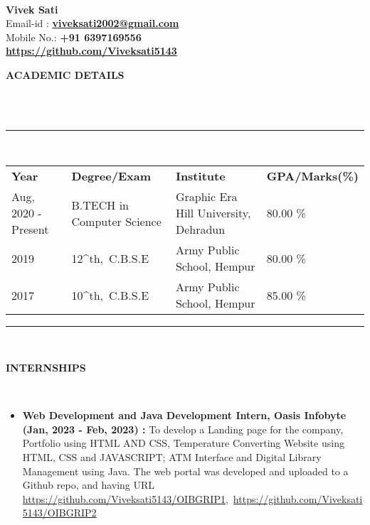 \documentclass[a4paper,10pt]{article}
\newcommand{\lsep}{-0.5cm}
\newcommand{\resheading}[1]{{\small \colorbox{mygrey}{\begin{minipage}{0.975\textwidth}{\textbf{#1 \vphantom{p\^{E}}}}\end{minipage}}}}
\begin{document}
\hspace{0.5cm}\\[-0.2cm]

\textbf{Vivek Sati} \\
\indent Email-id : \textbf{\url{viveksati2002@gmail.com}} \\
\indent Mobile No.: \textbf{+91 6397169556} \ \\
\indent \textbf{\url{https://github.com/Viveksati5143}}\\

\resheading{\textbf{ACADEMIC DETAILS} }\\[\lsep]
\\
\indent \rule{6.8in}{0.4pt}\\
\indent \begin{tabular}{ l @{\hskip 0.15in} l @{\hskip 0.15in} l @{\hskip 0.15in} l @{\hskip 0.15in} }
\noindent \textbf{Year} & \textbf{Degree/Exam} & \textbf{Institute} & \textbf{GPA/Marks(\%)}\\
Aug, 2020 - Present & B.TECH in Computer Science & Graphic Era Hill University, Dehradun & 80.00 \% \\
2019 & 12^{th},\ C.B.S.E & Army Public School, Hempur & 80.00 \% \\
2017 & 10^{th},\ C.B.S.E & Army Public School, Hempur & 85.00 \%\\

\end{tabular}
\indent \rule{6.8in}{0.4pt}
\\

\resheading{\textbf{INTERNSHIPS} }\\[\lsep]
\begin{itemize}
\setlength\itemsep{0.5em}
\item \textbf{Web Development and Java Development Intern, Oasis Infobyte (Jan, 2023 - Feb, 2023) : }To develop
a Landing page for the company, Portfolio using HTML AND CSS, Temperature Converting Website using HTML, CSS and JAVASCRIPT; ATM Interface and Digital Library Management using Java.
The web portal was developed and uploaded to a Github repo, and having URL \url{https://github.com/Viveksati5143/OIBGRIP1},\ \url{https://github.com/Viveksati5143/OIBGRIP2}
\end{itemize}
\end{document}
